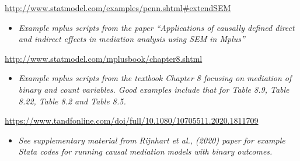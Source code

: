 \documentclass[
]{book}
\providecommand{\tightlist}{%
  \setlength{\itemsep}{0pt}\setlength{\parskip}{0pt}}
\begin{document}
\url{http://www.statmodel.com/examples/penn.shtml\#extendSEM}

\begin{itemize}
\tightlist
\item
  \emph{Example mplus scripts from the paper ``Applications of causally defined direct and indirect effects in mediation analysis using SEM in Mplus''}
\end{itemize}

\url{http://www.statmodel.com/mplusbook/chapter8.shtml}

\begin{itemize}
\tightlist
\item
  \emph{Example mplus scripts from the textbook Chapter 8 focusing on mediation of binary and count variables. Good examples include that for Table 8.9, Table 8.22, Table 8.2 and Table 8.5.}
\end{itemize}

\url{https://www.tandfonline.com/doi/full/10.1080/10705511.2020.1811709}

\begin{itemize}
\tightlist
\item
  \emph{See supplementary material from Rijnhart et al., (2020) paper for example Stata codes for running causal mediation models with binary outcomes.}
\end{itemize}

  
\end{document}
